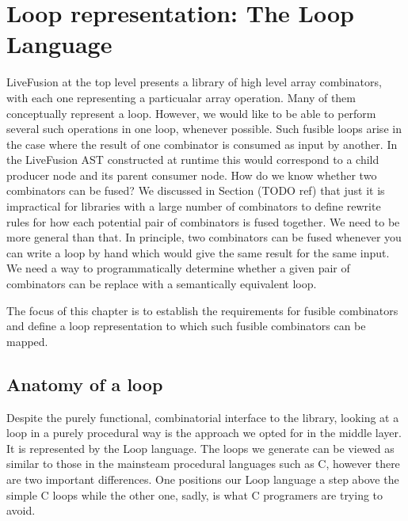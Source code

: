 \documentclass[preamble.tex]{subfiles}
\begin{document}
\pagebreak{}

\section{Loop representation: The Loop Language}

LiveFusion at the top level presents a library of high level array combinators, with each one representing a particualar array operation. Many of them conceptually represent a loop. However, we would like to be able to perform several such operations in one loop, whenever possible. Such fusible loops arise in the case where the result of one combinator is consumed as input by another. In the LiveFusion AST constructed at runtime this would correspond to a child producer node and its parent consumer node. How do we know whether two combinators can be fused? We discussed in Section (TODO ref) that just it is impractical for libraries with a large number of combinators to define rewrite rules for how each potential pair of combinators is fused together. We need to be more general than that. In principle, two combinators can be fused whenever you can write a loop by hand which would give the same result for the same input. We need a way to programmatically determine whether a given pair of combinators can be replace with a semantically equivalent loop.

The focus of this chapter is to establish the requirements for fusible combinators and define a loop representation to which such fusible combinators can be mapped.







\subsection{Anatomy of a loop}

Despite the purely functional, combinatorial interface to the library, looking at a loop in a purely procedural way is the approach we opted for in the middle layer. It is represented by the Loop language. The loops we generate can be viewed as similar to those in the mainsteam procedural languages such as C, however there are two important differences. One positions our Loop language a step above the simple C loops while the other one, sadly, is what C programers are trying to avoid.
\end{document}
